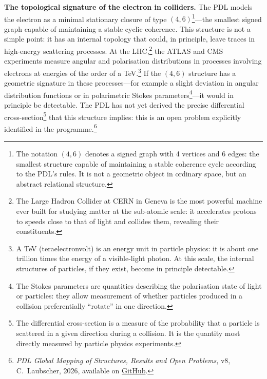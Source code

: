 \documentclass[12pt, a4paper, openright]{book}
\begin{document}
\medskip

\textbf{The topological signature of the electron in colliders.} The PDL models the electron as a minimal stationary closure of type $(4,6)$\footnote{The notation $(4,6)$ denotes a signed graph with 4 vertices and 6 edges: the smallest structure capable of maintaining a stable coherence cycle according to the PDL's rules. It is not a geometric object in ordinary space, but an abstract relational structure.}---the smallest signed graph capable of maintaining a stable cyclic coherence. This structure is not a simple point: it has an internal topology that could, in principle, leave traces in high-energy scattering processes. At the LHC,\footnote{The Large Hadron Collider at CERN in Geneva is the most powerful machine ever built for studying matter at the sub-atomic scale: it accelerates protons to speeds close to that of light and collides them, revealing their constituents.} the ATLAS and CMS experiments measure angular and polarisation distributions in processes involving electrons at energies of the order of a TeV.\footnote{A TeV (teraelectronvolt) is an energy unit in particle physics: it is about one trillion times the energy of a visible-light photon. At this scale, the internal structures of particles, if they exist, become in principle detectable.} If the $(4,6)$ structure has a geometric signature in these processes---for example a slight deviation in angular distribution functions or in polarimetric Stokes parameters\footnote{The Stokes parameters are quantities describing the polarisation state of light or particles: they allow measurement of whether particles produced in a collision preferentially ``rotate'' in one direction.}---it would in principle be detectable. The PDL has not yet derived the precise differential cross-section\footnote{The differential cross-section is a measure of the probability that a particle is scattered in a given direction during a collision. It is the quantity most directly measured by particle physics experiments.} that this structure implies: this is an open problem explicitly identified in the programme.\footnote{\textit{PDL Global Mapping of Structures, Results and Open Problems}, v8, C.~Laubscher, 2026, available on \href{https://github.com/laubscher-lab/PDL-framework}{GitHub}.}

\medskip
\end{document}
